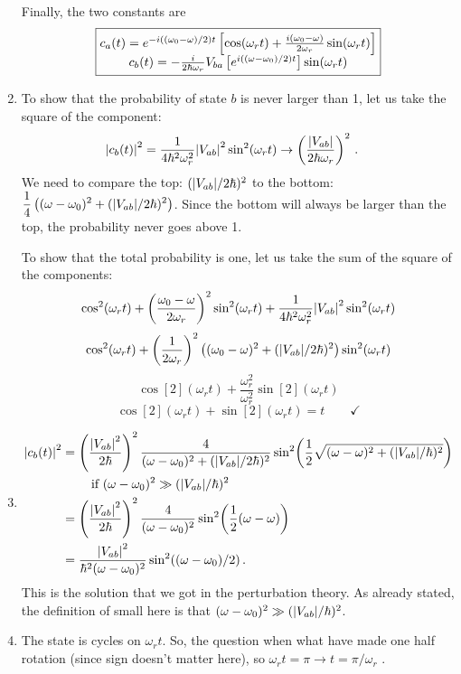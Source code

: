 \documentclass[11pt]{article}
\begin{document}
\begin{enumerate}[label=\alph*)]
Finally, the two constants are 
\[\boxed{\mqty{c_a(t) = e^{-i((\omega_0 - \omega)/2)t}\left[\cos(\omega_r t) + \frac{i(\omega_0 - \omega)}{2\omega_r}\sin(\omega_r t)\right] \\ c_b(t)  = -\frac{i}{2\hbar \omega_r}V_{ba} \left[e^{i((\omega-\omega_0)/2)t}\right]\sin(\omega_r t)}}\]

\item To show that the probability of state $b$ is never larger than 1, let us take the square of the component:
\begin{align*}
\abs{c_b(t)}^2 & = \frac{1}{4\hbar^2\omega_r^2}\abs{V_{ab}}^2 \sin[2](\omega_r t) \rightarrow \left(\frac{\abs{V_{ab}}}{2\hbar \omega_r}\right)^2 \, .
\end{align*}
We need to compare the top: $(\abs{V_{ab}}/2\hbar)^2$ to the bottom: $\displaystyle{\frac{1}{4}\left((\omega-\omega_0)^2 + (\abs{V_{ab}}/2\hbar)^2\right)}$. Since the bottom will always be larger than the top, the probability never goes above 1. 

To show that the total probability is one, let us take the sum of the square of the components:
\[\cos[2](\omega_r t) + \left(\frac{\omega_0 - \omega}{2\omega_r}\right)^2 \sin[2](\omega_r t) + \frac{1}{4\hbar^2 \omega^2_r}\abs{V_{ab}}^2\sin[2](\omega_r t)\]
\[\cos[2](\omega_r t) + \left(\frac{1}{2\omega_r}\right)^2 \left((\omega_0-\omega)^2 + (\abs{V_{ab}}/2\hbar)^2\right)\sin[2](\omega_r t)\]
\[\cos[2](\omega_r t) + \frac{\omega_r^2}{\omega_r^2} \sin[2](\omega_r t)\]
\[\cos[2](\omega_r t) + \sin[2](\omega_r t) = t \qquad \checkmark\]

\item 
\begin{align*}
\abs{c_b(t)}^2 & = \left(\frac{\abs{V_{ab}}^2}{2\hbar}\right)^2 \frac{4}{(\omega-\omega_0)^2 + (\abs{V_{ab}}/2\hbar)^2}\sin[2](\frac{1}{2}\sqrt{(\omega-\omega)^2 + (\abs{V_{ab}}/\hbar)^2})\\
& \qquad \text{ if } (\omega - \omega_0)^2 \gg (\abs{V_{ab}}/\hbar)^2\\
& = \left(\frac{\abs{V_{ab}}^2}{2\hbar}\right)^2 \frac{4}{(\omega-\omega_0)^2}\sin[2](\frac{1}{2}(\omega-\omega))\\
& = \frac{\abs{V_{ab}}^2}{\hbar^2 (\omega-\omega_0)^2}\sin[2]((\omega-\omega_0)/2) \, .
\end{align*}
This is the solution that we got in the perturbation theory. As already stated, the definition of small here is that $(\omega - \omega_0)^2 \gg (\abs{V_{ab}}/\hbar)^2$. 

\item The state is cycles on $\omega_r t$. So, the question when what have made one half rotation (since sign doesn't matter here), so $\omega_r t = \pi \rightarrow \boxed{t = \pi/\omega_r}$ . 

\end{enumerate}
\end{document}

